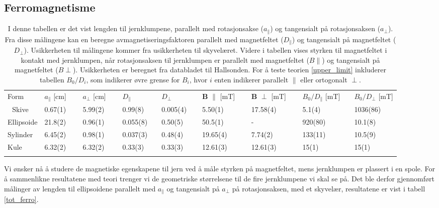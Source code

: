 \documentclass[%
 reprint,
 amsmath,amssymb,
 aps,
 norsk,
]{revtex4-1}
\begin{document}
\subsection{Ferromagnetisme}
\begin{table}\renewcommand{\arraystretch}{1.2}
\centering
\caption{I denne tabellen er det vist lengden til jernklumpene, parallelt med rotasjonsakse ($a_{\parallel}$) og tangensialt på rotasjonsaksen ($a_{\perp}$). Fra disse målingene kan en beregne avmagnetiseringsfaktoren parallelt med magnetfeltet ($D_{\parallel}$) og tangensialt på magnetfeltet ($D_{\perp}$). Usikkerheten til målingene kommer fra usikkerheten til skyvelæret. Videre i tabellen vises styrken til magnetfeltet i kontakt med jernklumpen, når rotasjonsaksen til jernklumpen er parallelt med magnetfeltet ($B\parallel$) og tangensialt på magnetfeltet ($B\perp$). Usikkerheten er beregnet fra databladet til Hallsonden. For å teste teorien \eqref{upper_limit} inkluderer tabellen $B_0/D_i$, som indikerer øvre grense for $B_i$, hvor $i$ enten indikerer parallelt $\parallel$ eller ortogonalt $\perp$.}
\label{tot_ferro}
\begin{tabular}{@{}lllllllll@{}}
\botrule
Form & $a_{\parallel}$ {[}cm{]} $\quad$  & $a_{\perp}$ {[}cm{]} $\quad$  & $D_{\parallel}$ $\qquad \quad$ & $D_{\perp}$ $\qquad\quad$ &  $\bm{B}$  $\parallel$ {[}mT{]} $\quad$ & $\bm{B}$ $\perp$ {[}mT{]} $\quad$ & $B_0/D_{\parallel}$ [mT]$\quad$  & $B_0/D_{\perp}$ [mT]\\ \colrule 
Skive      & 0.67(1)        & 5.99(2)           & 0.99(8)         & 0.005(4) & 5.50(1)                           & 17.58(4)         &    5.1(4)  &  1036(86)      \\
Ellipsoide & 21.8(2)        & 0.96(1)           & 0.055(8)        & 0.50(5) & 50.5(1)                           & -                &   920(80)    & 10.1(8)       \\
Sylinder   & 6.45(2)        & 0.98(1)           & 0.037(3)        & 0.48(4) & 19.65(4)                          & 7.74(2)          &   133(11)    &10.5(9)           \\
Kule       & 6.32(2)        & 6.32(2)           & 0.33(3)         & 0.33(3) & 12.61(3)            & 12.61(3)                &   15(1)  & 15(1)        \\ \botrule
\end{tabular}
\end{table}
Vi ønsker nå å studere de magnetiske egenskapene til jern ved å måle styrken på magnetfeltet, mens jernklumpen er plassert i en spole. For å sammenlikne resultatene med teori trenger vi de geometriske størrelsene til de fire jernklumpene vi skal se på. Det ble derfor gjennomført målinger av lengden til ellipsoidene parallelt med $a_{\parallel}$ og tangensialt på $a_{\perp}$ på rotasjonsaksen, med et skyvelær, resultatene er vist  i tabell \vref{tot_ferro}.
\end{document}
